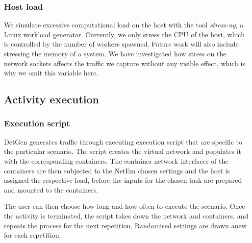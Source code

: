 \documentclass[runningheads]{llncs}
\begin{document}

\subsubsection{Host load}

We simulate excessive computational load on the host with the tool \emph{stress-ng}, a Linux workload generator. Currently, we only stress the CPU of the host, which is controlled by the number of workers spawned. Future work will also include stressing the memory of a system. We have investigated how stress on the network sockets affects the traffic we capture without any visible effect, which is why we omit this variable here.   

\subsection{Activity execution}

\subsubsection*{Execution script}

DetGen generates traffic through executing execution script that are specific to the particular scenario. The script creates the virtual network and populates it with the corresponding containers. The container network interfaces of the containers are then subjected to the NetEm chosen settings and the host is assigned the respective load, before the inputs for the chosen task are prepared and mounted to the containers. 

The user can then choose how long and how often to execute the scenario. Once the activity is terminated, the script takes down the network and containers, and repeats the process for the next repetition. Randomised settings are drawn anew for each repetition.
\end{document}
